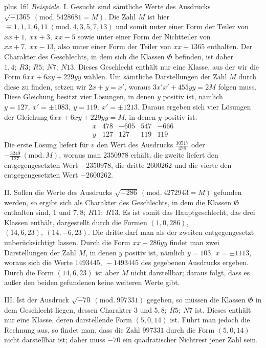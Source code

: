 {\rightskip=0pt plus 1fil\relax
\textit{Beispiele.} I. Gesucht sind sämtliche Werte des Ausdrucks \(\surd{-1365}\ (\mathrm{mod.}\ 5428681=M)\). Die Zahl \(M\) ist hier \(\equiv1,\allowbreak 1,\allowbreak 1,\allowbreak 6,\allowbreak 11\ (\mathrm{mod.}\ 4,\allowbreak 3,\allowbreak 5,\allowbreak 7,\allowbreak 13)\) und somit unter einer Form der Teiler von \(xx+1,\allowbreak \ xx+3,\allowbreak \ xx-5\) sowie unter einer Form der Nichtteiler von \(xx+7,\allowbreak \ xx-13\), also unter einer Form der Teiler von \(xx+1365\) enthalten. Der Charakter des Geschlechts, in dem sich die Klassen \(\mathfrak G\) befinden, ist daher \(1,\allowbreak 4;\allowbreak \ R3;\allowbreak \ R5;\allowbreak \ N7;\allowbreak \ N13\). Dieses Geschlecht enthält nur eine Klasse, aus der wir die Form \(6xx+6xy+229yy\) wählen. Um sämtliche Darstellungen der Zahl \(M\) durch diese zu finden, setzen wir \(2x+y=x'\), woraus \(3x'x'+455yy=2M\) folgen muss. Diese Gleichung besitzt vier Lösungen, in denen \(y\) positiv ist, nämlich \(y=127,\allowbreak \ x'=\pm1083,\allowbreak \ y=119,\allowbreak \ x'=\pm1213\). Daraus ergeben sich vier Lösungen der Gleichung \(6xx+6xy+229yy=M\), in denen \(y\) positiv ist: \[\renewcommand{\arraystretch}{1.25}\begin{array}{c|r|r|r|r}x&478&-605&547&-666\\y&127&127&119&119\end{array}\] Die erste Lösung liefert für \(v\) den Wert des Ausdrucks \(\frac{30517}{478}\) oder \(-\frac{3249}{127}\ (\mathrm{mod.}\ M)\), woraus man
\(2350978\) erhält; die zweite liefert den entgegengesetzten Wert \(-2350978\), die dritte \(2600262\) und die vierte den entgegengesetzten Wert \(-2600262\).
\par}

II. Sollen die Werte des Ausdrucks \(\surd{-286}\ (\mathrm{mod.}\ 4272943=M)\) gefunden werden, so ergibt sich als Charakter des Geschlechts, in dem die Klassen \(\mathfrak G\) enthalten sind, \(1\text{ und }7,\allowbreak 8;\allowbreak \ R11;\allowbreak \ R13\). Es ist somit das Hauptgeschlecht, das drei Klassen enthält, dargestellt durch die Formen \((1,\allowbreak 0,\allowbreak 286)\), \((14,\allowbreak 6,\allowbreak 23),\allowbreak \ (14,\allowbreak -6,\allowbreak 23)\). Die dritte darf man als der zweiten entgegengesetzt unberücksichtigt lassen. Durch die Form \(xx+286yy\) findet man zwei Darstellungen der Zahl \(M\), in denen \(y\) positiv ist, nämlich \(y=103,\allowbreak \ x=\pm1113\), woraus sich die Werte \(1493445,\allowbreak \ -1493445\) des gegebenen Ausdrucks ergeben. Durch die Form \((14,\allowbreak 6,\allowbreak 23)\) ist aber \(M\) nicht darstellbar; daraus folgt, dass es außer den beiden gefundenen keine weiteren Werte gibt.

III. Ist der Ausdruck \(\surd{-70}\ (\mathrm{mod.}\ 997331)\) gegeben, so müssen die Klassen \(\mathfrak G\) in dem Geschlecht liegen, dessen Charakter \(3\text{ und }5,\allowbreak 8;\allowbreak \ R5;\allowbreak \ N7\) ist. Dieses enthält nur eine Klasse, deren darstellende Form \((5,\allowbreak 0,\allowbreak 14)\) ist. Führt man jedoch die Rechnung aus, so findet man, dass die Zahl \(997331\) durch die Form \((5,\allowbreak 0,\allowbreak 14)\) nicht darstellbar ist; daher muss \(-70\) ein quadratischer Nichtrest jener Zahl sein.
